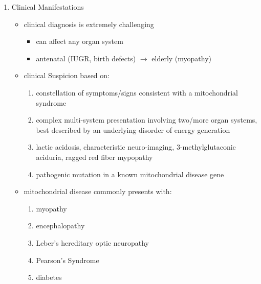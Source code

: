 \documentclass{scrartcl}
\begin{document}
\begin{enumerate}
\item Clinical Manifestations
\label{sec:org631ec3b}
\begin{itemize}
\item clinical diagnosis is extremely challenging
\begin{itemize}
\item can affect any organ system
\item antenatal (IUGR, birth defects) \(\to\) elderly (myopathy)
\end{itemize}

\item clinical Suspicion based on:
\begin{enumerate}
\item constellation of symptoms/signs consistent with a mitochondrial syndrome
\item complex multi-system presentation involving two/more organ systems,
best described by an underlying disorder of energy generation
\item lactic acidosis, characteristic neuro-imaging, 3-methylglutaconic
aciduria, ragged red fiber mypopathy
\item pathogenic mutation in a known mitochondrial disease gene
\end{enumerate}

\item mitochondrial disease commonly presents with:
\begin{enumerate}
\item myopathy
\item encephalopathy
\item Leber’s hereditary optic neuropathy
\item Pearson's Syndrome
\item diabetes
\end{enumerate}
\end{itemize}


\end{enumerate}
\end{document}
